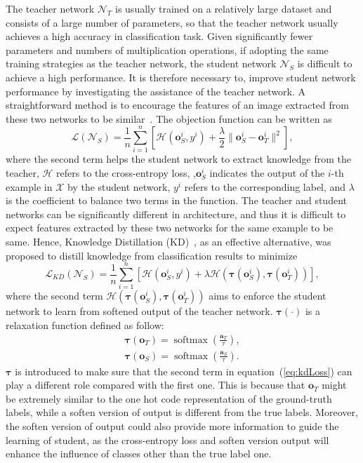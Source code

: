 \documentclass[journal]{IEEEtran}
\DeclareMathOperator{\softmax}{softmax}
\newcommand{\Eref}[1]{equation~(\ref{#1})}
\newcommand{\bo}{\bm{o}}
\newcommand{\ba}{\bm{a}}
\begin{document}
The teacher network $\mathcal N_T$ is usually trained on a relatively large dataset and consists of a large number of parameters, so that the teacher network usually achieves a high accuracy in classification task. Given significantly fewer parameters and numbers of multiplication operations, if adopting the same training strategies as the teacher network, the student network $\mathcal N_S$ is difficult to achieve a high performance. It is therefore necessary to, improve student network performance by investigating the assistance of the teacher network. A straightforward method is to encourage the features of an image extracted from these two networks to be similar~\cite{NIPS2014_5484}. The objection function can be written as 
\begin{equation}
\mathcal L(\mathcal N_S) = \frac{1}{n}\sum_{i=1}^n[\mathcal H(\bo_S^i,y^i) + \frac{\lambda}{2} \| \bo_S^i-\bo_T^i\|^2],
\label{eq:2}
\end{equation}
where the second term helps the student network to extract knowledge from the teacher, $\mathcal{H}$ refers to the cross-entropy loss, ,$\bo_S^i$ indicates the output of the $i$-th example in $\mathcal{X}$ by the student network, $y^i$ refers to the corresponding label, and $\lambda$ is the coefficient to balance two terms in the function.
The teacher and student networks can be significantly different in architecture, and thus it is difficult to expect features extracted by these two networks for the same example to be same. Hence, Knowledge Distillation (KD)~\cite{hinton2015distilling}, as an effective alternative, was proposed to distill knowledge from classification results to minimize
\begin{equation}
\mathcal L_{KD}(\mathcal N_S) = \frac{1}{n}\sum_{i=1}^n[\mathcal H(\bo_S^i,y^i) + \lambda \mathcal H(\bm \tau(\bo_S^i),\bm \tau(\bo_T^i))],
\label{eq:kdLoss}
\end{equation}
where the second term $\mathcal H(\bm \tau(\bo_S^i),\bm \tau(\bo_T^i))$ aims to enforce the student network to learn from softened output of the teacher network. $\bm\tau(\cdot)$ is a relaxation function defined as follow:
\begin{equation}
\begin{aligned}
\bm \tau(\bo_T) = \softmax(\frac{\ba_T}{\tau}), \\
\bm \tau(\bo_S) = \softmax(\frac{\ba_S}{\tau}).
\end{aligned}
\label{eq:tau}
\end{equation}
$\bm\tau$ is introduced to make sure that the second term in \Eref{eq:kdLoss} can play a different role compared with the first one. This is because that $\bo_T$ might be extremely similar to the one hot code representation of the ground-truth labels, while a soften version of output is different from the true labels. Moreover, the soften version of output could also provide more information to guide the learning of student, as the cross-entropy loss and soften version output will enhance the influence of classes other than the true label one.
\end{document}
